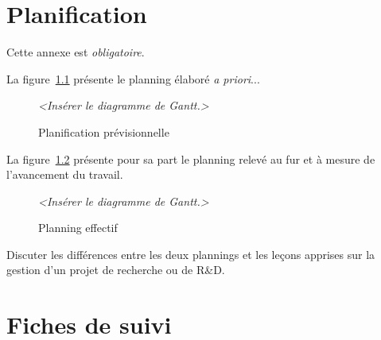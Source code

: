 \documentclass[11pt, french]{report-rd-info}
\begin{document}
\chapter{Planification}

Cette annexe est \emph{obligatoire}.

La figure~\ref{fig:PlanningPrevisionnel} présente le planning élaboré \emph{a priori}...

\begin{figure}
	\centering
		\emph{<Insérer le diagramme de Gantt.>}
	\caption{Planification prévisionnelle}
	\label{fig:PlanningPrevisionnel}
\end{figure}

La figure~\ref{fig:PlanningEffectif} présente pour sa part le planning relevé au fur et à mesure de l'avancement du travail.

\begin{figure}
	\centering
		\emph{<Insérer le diagramme de Gantt.>}
	\caption{Planning effectif}
	\label{fig:PlanningEffectif}
\end{figure}

Discuter les différences entre les deux plannings et les leçons apprises sur la gestion d'un projet de recherche ou de R\&D.

\chapter{Fiches de suivi}
\label{ann:FichesSuivi}
\end{document}
